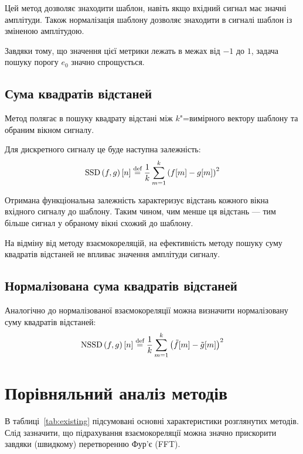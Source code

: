         Цей метод дозволяє знаходити шаблон, навіть якщо вхідний сигнал має значні  амплітуди.
        Також нормалізація шаблону дозволяє знаходити в сигналі шаблон із зміненою амплітудою.

        Завдяки тому, що значення цієї метрики лежать в межах від ${-1}$ до $1$, задача пошуку порогу $e_0$ значно
        спрощується.

    \subsection{Сума квадратів відстаней}
        Метод полягає в пошуку квадрату відстані між $k$"=вимірного вектору шаблону та обраним вікном сигналу.

        Для дискретного сигналу це буде наступна залежність:
        \begin{equation}
            \text{SSD}\left(f, g\right)[ n ] \stackrel{\text{def}}{=} \frac{1}{k}\sum\limits_{m=1}^k {\left(f[m] - g[m]\right)}^2
        \end{equation}

        Отримана функціональна залежність характеризує відстань кожного вікна вхідного сигналу до шаблону.
        Таким чином, чим менше ця відстань --- тим більше сигнал у обраному вікні схожий до шаблону.

        На відміну від методу взаємокореляцій, на ефективність методу пошуку суму квадратів відстаней не впливає
        значення амплітуди сигналу.
    \subsection{Нормалізована сума квадратів відстаней}
        Аналогічно до нормалізованої взаємокореляції можна визначити нормалізовану суму квадратів відстаней:
        \begin{equation}
            \text{NSSD}\left(f, g\right)[ n ] \stackrel{\text{def}}{=} \frac{1}{k}\sum\limits_{m=1}^k {\left(\tilde{f}[m] -
                    \tilde{g}[m]\right)}^2
        \end{equation}

\section{Порівняльний аналіз методів}
\label{s:existing-compare}
    В таблиці~\ref{tab:existing} підсумовані основні характеристики розглянутих методів.
    Слід зазначити, що підрахування взаємокореляції можна значно прискорити завдяки (швидкому) перетворенню Фур’є
    (FFT).

